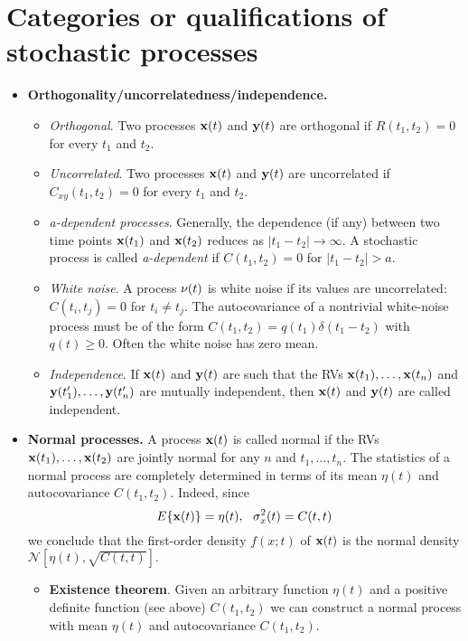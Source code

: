 \documentclass[a4paper, oneside]{book}
\begin{document}
\section{Categories or qualifications of stochastic processes}
\begin{itemize}
\item \textbf{Orthogonality/uncorrelatedness/independence.}
\begin{itemize}
\item \textit{Orthogonal}. Two processes $\mathbf x(t)$ and $\mathbf y(t)$ are orthogonal if $R(t_1,t_2)=0$ for every $t_1$ and $t_2$.
\item \textit{Uncorrelated}. Two processes $\mathbf x(t)$ and $\mathbf y(t)$ are uncorrelated if $C_{xy}(t_1,t_2)=0$ for every $t_1$ and $t_2$.
\item \textit{a-dependent processes}. Generally, the dependence (if any) between two time points $\mathbf x(t_1)$ and $\mathbf x(t_2)$ reduces as $|t_1-t_2|\to \infty$. A stochastic process is called \textit{a-dependent} if $C(t_1,t_2)=0$ for $|t_1-t_2|>a$.
\item \textit{White noise}. A process $\mathbf \nu(t)$ is white noise if its values are uncorrelated: $C(t_i,t_j) = 0$ for $t_i\neq t_j$. The autocovariance of a nontrivial white-noise process must be of the form $C(t_1,t_2)=q(t_1)\delta(t_1-t_2)$ with $q(t)\ge 0$. Often the white noise has zero mean.
\item \textit{Independence}. If $\mathbf x(t)$ and $\mathbf y(t)$ are such that the RVs $\mathbf x(t_1),\dots,\mathbf x(t_n)$ and $\mathbf y(t_1'), \dots, \mathbf y(t_n')$ are mutually independent, then $\mathbf x(t)$ and $\mathbf y(t)$ are called independent.
\end{itemize}

\item \textbf{Normal processes.} A process $\mathbf x(t)$ is called normal if the RVs $\mathbf x(t_1),\dots,\mathbf x(t_2)$ are jointly normal for any $n$ and $t_1, \dots, t_n$. The statistics of a normal process are completely determined in terms of its mean $\eta(t)$ and autocovariance $C(t_1,t_2)$. Indeed, since 
\begin{equation}
E\{\mathbf x(t)\} = \eta (t), \,\,\,\, \sigma_x^2(t) = C(t,t)
\end{equation}
we conclude that the first-order density $f(x;t)$ of $\mathbf x(t)$ is the normal density $\mathcal{N}\left[\eta(t), \sqrt{C(t,t)}\right].$
\begin{itemize}
\item \textbf{Existence theorem}. Given an arbitrary function $\eta (t)$ and a positive definite function (see above) $C(t_1,t_2)$ we can construct a normal process with mean $\eta(t)$ and autocovariance $C(t_1,t_2)$.
\end{itemize}


\end{itemize}
\end{document}

